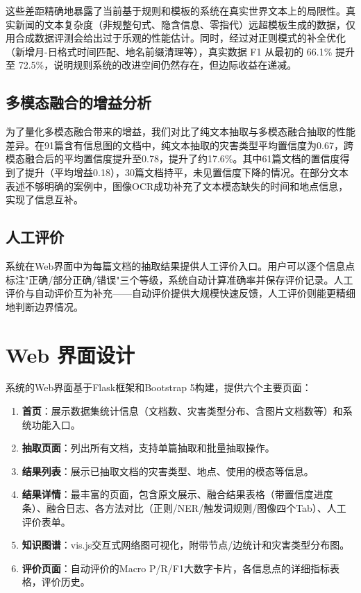 \documentclass[12pt, a4paper]{ctexart}
\begin{document}
这些差距精确地暴露了当前基于规则和模板的系统在真实世界文本上的局限性。真实新闻的文本复杂度（非规整句式、隐含信息、零指代）远超模板生成的数据，仅用合成数据评测会给出过于乐观的性能估计。同时，经过对正则模式的补全优化（新增月-日格式时间匹配、地名前缀清理等），真实数据 F1 从最初的 66.1\% 提升至 72.5\%，说明规则系统的改进空间仍然存在，但边际收益在递减。

\subsection{多模态融合的增益分析}

为了量化多模态融合带来的增益，我们对比了纯文本抽取与多模态融合抽取的性能差异。在91篇含有信息图的文档中，纯文本抽取的灾害类型平均置信度为0.67，跨模态融合后的平均置信度提升至0.78，提升了约17.6\%。其中61篇文档的置信度得到了提升（平均增益0.18），30篇文档持平，未见置信度下降的情况。在部分文本表述不够明确的案例中，图像OCR成功补充了文本模态缺失的时间和地点信息，实现了信息互补。

\subsection{人工评价}

系统在Web界面中为每篇文档的抽取结果提供人工评价入口。用户可以逐个信息点标注"正确/部分正确/错误"三个等级，系统自动计算准确率并保存评价记录。人工评价与自动评价互为补充——自动评价提供大规模快速反馈，人工评价则能更精细地判断边界情况。


\section{Web 界面设计}

系统的Web界面基于Flask框架和Bootstrap 5构建，提供六个主要页面：

\begin{enumerate}[itemsep=2pt]
    \item \textbf{首页}：展示数据集统计信息（文档数、灾害类型分布、含图片文档数等）和系统功能入口。
    \item \textbf{抽取页面}：列出所有文档，支持单篇抽取和批量抽取操作。
    \item \textbf{结果列表}：展示已抽取文档的灾害类型、地点、使用的模态等信息。
    \item \textbf{结果详情}：最丰富的页面，包含原文展示、融合结果表格（带置信度进度条）、融合日志、各方法对比（正则/NER/触发词规则/图像四个Tab）、人工评价表单。
    \item \textbf{知识图谱}：vis.js交互式网络图可视化，附带节点/边统计和灾害类型分布图。
    \item \textbf{评价页面}：自动评价的Macro P/R/F1大数字卡片，各信息点的详细指标表格，评价历史。
\end{enumerate}
\end{document}
